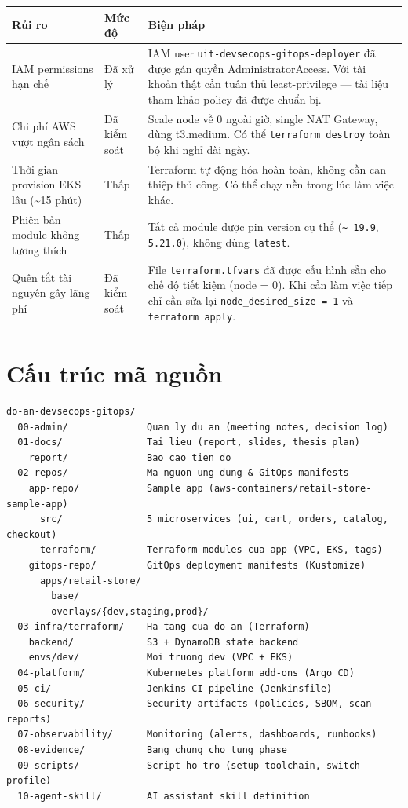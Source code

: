 \documentclass[12pt,a4paper]{article}
\begin{document}
\begin{longtable}{p{} p{} p{}}
\toprule
\textbf{Rủi ro}               & \textbf{Mức độ}   & \textbf{Biện pháp} \\
\midrule
IAM permissions hạn chế &
Đã xử lý &
IAM user \texttt{uit-devsecops-gitops-deployer} đã được gán quyền AdministratorAccess. Với tài khoản thật cần tuân thủ least-privilege — tài liệu tham khảo policy đã được chuẩn bị. \\
\midrule
Chi phí AWS vượt ngân sách &
Đã kiểm soát &
Scale node về 0 ngoài giờ, single NAT Gateway, dùng t3.medium. Có thể \texttt{terraform destroy} toàn bộ khi nghỉ dài ngày. \\
\midrule
Thời gian provision EKS lâu (\textasciitilde 15 phút) &
Thấp &
Terraform tự động hóa hoàn toàn, không cần can thiệp thủ công. Có thể chạy nền trong lúc làm việc khác. \\
\midrule
Phiên bản module không tương thích &
Thấp &
Tất cả module được pin version cụ thể (\texttt{\textasciitilde\ 19.9}, \texttt{5.21.0}), không dùng \texttt{latest}. \\
\midrule
Quên tắt tài nguyên gây lãng phí &
Đã kiểm soát &
File \texttt{terraform.tfvars} đã được cấu hình sẵn cho chế độ tiết kiệm (node = 0). Khi cần làm việc tiếp chỉ cần sửa lại \texttt{node\_desired\_size = 1} và \texttt{terraform apply}. \\
\bottomrule
\end{longtable}

\section{Cấu trúc mã nguồn}

\begin{verbatim}
do-an-devsecops-gitops/
  00-admin/              Quan ly du an (meeting notes, decision log)
  01-docs/               Tai lieu (report, slides, thesis plan)
    report/              Bao cao tien do
  02-repos/              Ma nguon ung dung & GitOps manifests
    app-repo/            Sample app (aws-containers/retail-store-sample-app)
      src/               5 microservices (ui, cart, orders, catalog, checkout)
      terraform/         Terraform modules cua app (VPC, EKS, tags)
    gitops-repo/         GitOps deployment manifests (Kustomize)
      apps/retail-store/
        base/
        overlays/{dev,staging,prod}/
  03-infra/terraform/    Ha tang cua do an (Terraform)
    backend/             S3 + DynamoDB state backend
    envs/dev/            Moi truong dev (VPC + EKS)
  04-platform/           Kubernetes platform add-ons (Argo CD)
  05-ci/                 Jenkins CI pipeline (Jenkinsfile)
  06-security/           Security artifacts (policies, SBOM, scan reports)
  07-observability/      Monitoring (alerts, dashboards, runbooks)
  08-evidence/           Bang chung cho tung phase
  09-scripts/            Script ho tro (setup toolchain, switch profile)
  10-agent-skill/        AI assistant skill definition
\end{verbatim}
\end{document}
